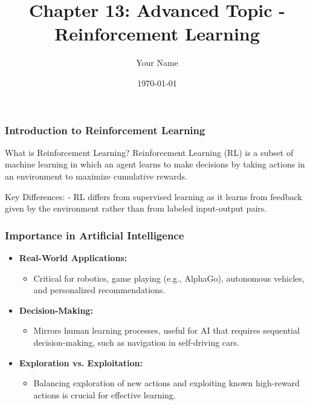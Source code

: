 \documentclass[aspectratio=169]{beamer}
\title[Reinforcement Learning]{Chapter 13: Advanced Topic - Reinforcement Learning}
\author[Your Name]{Your Name}
\date{\today}
\begin{document}
\frame{\titlepage}

\begin{frame}[fragile]
    \frametitle{Introduction to Reinforcement Learning}
    \begin{block}{What is Reinforcement Learning?}
        Reinforcement Learning (RL) is a subset of machine learning in which an agent learns to make decisions by taking actions in an environment to maximize cumulative rewards.
    \end{block}
    \begin{block}{Key Differences:}
        - RL differs from supervised learning as it learns from feedback given by the environment rather than from labeled input-output pairs.
    \end{block}
\end{frame}

\begin{frame}[fragile]
    \frametitle{Importance in Artificial Intelligence}
    \begin{itemize}
        \item \textbf{Real-World Applications:}
        \begin{itemize}
            \item Critical for robotics, game playing (e.g., AlphaGo), autonomous vehicles, and personalized recommendations.
        \end{itemize}
        
        \item \textbf{Decision-Making:}
        \begin{itemize}
            \item Mirrors human learning processes, useful for AI that requires sequential decision-making, such as navigation in self-driving cars.
        \end{itemize}
        
        \item \textbf{Exploration vs. Exploitation:}
        \begin{itemize}
            \item Balancing exploration of new actions and exploiting known high-reward actions is crucial for effective learning.
        \end{itemize}
    \end{itemize}
\end{frame}
\end{document}
